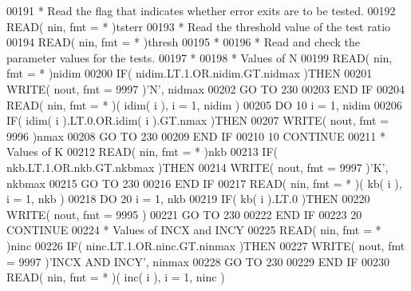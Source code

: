 \begin{DoxyCode}
00191 \textcolor{comment}{*     Read the flag that indicates whether error exits are to be tested.}
00192       \textcolor{keyword}{READ}( nin, fmt = * )tsterr
00193 \textcolor{comment}{*     Read the threshold value of the test ratio}
00194       \textcolor{keyword}{READ}( nin, fmt = * )thresh
00195 \textcolor{comment}{*}
00196 \textcolor{comment}{*     Read and check the parameter values for the tests.}
00197 \textcolor{comment}{*}
00198 \textcolor{comment}{*     Values of N}
00199       \textcolor{keyword}{READ}( nin, fmt = * )nidim
00200       \textcolor{keywordflow}{IF}( nidim.LT.1.OR.nidim.GT.nidmax )\textcolor{keywordflow}{THEN}
00201          \textcolor{keyword}{WRITE}( nout, fmt = 9997 )\textcolor{stringliteral}{'N'}, nidmax
00202          \textcolor{keywordflow}{GO TO} 230
00203 \textcolor{keywordflow}{      END IF}
00204       \textcolor{keyword}{READ}( nin, fmt = * )( idim( i ), i = 1, nidim )
00205       \textcolor{keywordflow}{DO} 10 i = 1, nidim
00206          \textcolor{keywordflow}{IF}( idim( i ).LT.0.OR.idim( i ).GT.nmax )\textcolor{keywordflow}{THEN}
00207             \textcolor{keyword}{WRITE}( nout, fmt = 9996 )nmax
00208             \textcolor{keywordflow}{GO TO} 230
00209 \textcolor{keywordflow}{         END IF}
00210    10 \textcolor{keywordflow}{CONTINUE}
00211 \textcolor{comment}{*     Values of K}
00212       \textcolor{keyword}{READ}( nin, fmt = * )nkb
00213       \textcolor{keywordflow}{IF}( nkb.LT.1.OR.nkb.GT.nkbmax )\textcolor{keywordflow}{THEN}
00214          \textcolor{keyword}{WRITE}( nout, fmt = 9997 )\textcolor{stringliteral}{'K'}, nkbmax
00215          \textcolor{keywordflow}{GO TO} 230
00216 \textcolor{keywordflow}{      END IF}
00217       \textcolor{keyword}{READ}( nin, fmt = * )( kb( i ), i = 1, nkb )
00218       \textcolor{keywordflow}{DO} 20 i = 1, nkb
00219          \textcolor{keywordflow}{IF}( kb( i ).LT.0 )\textcolor{keywordflow}{THEN}
00220             \textcolor{keyword}{WRITE}( nout, fmt = 9995 )
00221             \textcolor{keywordflow}{GO TO} 230
00222 \textcolor{keywordflow}{         END IF}
00223    20 \textcolor{keywordflow}{CONTINUE}
00224 \textcolor{comment}{*     Values of INCX and INCY}
00225       \textcolor{keyword}{READ}( nin, fmt = * )ninc
00226       \textcolor{keywordflow}{IF}( ninc.LT.1.OR.ninc.GT.ninmax )\textcolor{keywordflow}{THEN}
00227          \textcolor{keyword}{WRITE}( nout, fmt = 9997 )\textcolor{stringliteral}{'INCX AND INCY'}, ninmax
00228          \textcolor{keywordflow}{GO TO} 230
00229 \textcolor{keywordflow}{      END IF}
00230       \textcolor{keyword}{READ}( nin, fmt = * )( inc( i ), i = 1, ninc )

\end{DoxyCode}
